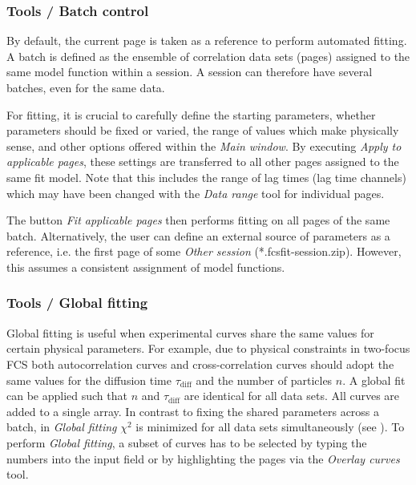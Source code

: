 \subsubsection{Tools / Batch control}
\label{sec:menub.tools.batch}
By default, the current page is taken as a reference to perform automated fitting. A batch is defined as the ensemble of correlation data sets (pages) assigned to the same model function within a session. A session can therefore have several batches, even for the same data. 

For fitting, it is crucial to carefully define the starting parameters, whether parameters should be fixed or varied, the range of values which make physically sense, and other options offered within the \textit{Main window}. By executing \textit{Apply to applicable pages}, these settings are transferred to all other pages assigned to the same fit model. Note that this includes the range of lag times (lag time channels) which may have been changed with the \textit{Data range }tool for individual pages.

The button \textit{Fit applicable pages} then performs fitting on all pages of the same batch. Alternatively, the user can define an external source of parameters as a reference, i.e. the first page of some \textit{Other session} (*.fcsfit-session.zip). However, this assumes a consistent assignment of model functions.

\subsubsection{Tools / Global fitting}
\label{sec:menub.tools.globa}
Global fitting is useful when experimental curves share the same values for certain physical parameters. For example, due to physical constraints in two-focus FCS both autocorrelation curves and  cross-correlation curves should adopt the same values for the diffusion time $\tau_\mathrm{diff}$ and the number of particles $n$. A global fit can be applied such that $n$ and $\tau_\mathrm{diff}$ are identical for all data sets. All curves are added to a single array. In contrast to fixing the shared parameters across a batch, in \textit{Global fitting} $\chi^2$  is minimized for all data sets simultaneously (see ). To perform \textit{Global fitting}, a subset of curves has to be selected by typing the numbers into the input field or by highlighting the pages via the \textit{Overlay curves} tool. 

